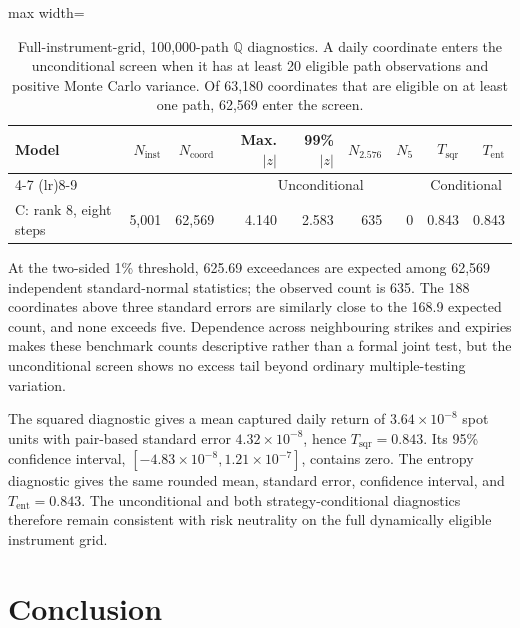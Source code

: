 \documentclass[11pt]{article}
\newcommand{\Q}{\mathbb Q}
\newcommand{\abs}[1]{\lvert #1\rvert}
\theoremstyle{plain}
\theoremstyle{definition}
\theoremstyle{remark}
\begin{document}
\begin{table}[H]
\centering
\small
\begin{adjustbox}{max width=\textwidth}
\begin{tabular}{lrrrrrrrr}
\toprule
Model & $N_{\mathrm{inst}}$ & $N_{\mathrm{coord}}$
& Max. $\abs{z}$ & 99\% $\abs{z}$
& $N_{2.576}$ & $N_5$ & $T_{\mathrm{sqr}}$ & $T_{\mathrm{ent}}$\\
\cmidrule(lr){4-7}
\cmidrule(lr){8-9}
& & & \multicolumn{4}{c}{Unconditional} & \multicolumn{2}{c}{Conditional}\\
\midrule
C: rank 8, eight steps
& 5,001 & 62,569 & {\color{orange}4.140} & 2.583 & 635 & 0 & 0.843 & 0.843\\
\bottomrule
\end{tabular}
\end{adjustbox}
\caption{Full-instrument-grid, 100,000-path $\Q$ diagnostics.  A daily
coordinate enters the unconditional screen when it has at least 20 eligible
path observations and positive Monte Carlo variance.  Of 63,180 coordinates
that are eligible on at least one path, 62,569 enter the screen.}
\label{tab:numerics-full-instrument-grid}
\end{table}

At the two-sided 1\% threshold, 625.69 exceedances are expected among 62,569
independent standard-normal statistics; the observed count is 635.  The 188
coordinates above three standard errors are similarly close to the 168.9
expected count, and none exceeds five.  Dependence across neighbouring strikes
and expiries makes these benchmark counts descriptive rather than a formal
joint test, but the unconditional screen shows no excess tail beyond ordinary
multiple-testing variation.

The squared diagnostic gives a mean captured daily return of
$3.64\times10^{-8}$ spot units with pair-based standard error
$4.32\times10^{-8}$, hence $T_{\mathrm{sqr}}=0.843$.  Its 95\% confidence
interval, $[-4.83\times10^{-8},1.21\times10^{-7}]$, contains zero.  The entropy
diagnostic gives the same rounded mean, standard error, confidence interval,
and $T_{\mathrm{ent}}=0.843$.  The unconditional and both
strategy-conditional diagnostics therefore remain consistent with risk
neutrality on the full dynamically eligible instrument grid.

\section{Conclusion}
\end{document}
